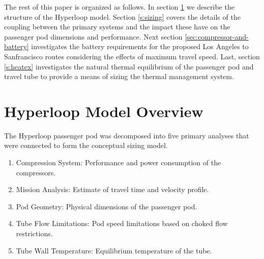 \documentclass[heading.tex]{subfiles}
\begin{document}
The rest of this paper is organized as follows. In section \ref{s:struct} we describe the structure of the Hyperloop 
model. Section \ref{s:sizing} covers the details of the coupling between the primary systems and the impact these have 
on the passenger pod dimensions and performance. Next section \ref{sec:compressor-and-battery}
investigates the battery requirements for the proposed Los Angeles to Sanfrancisco routes considering the effects 
of maximum travel speed. Last, section \ref{s:heatex} investigates the natural thermal equilibrium of the passenger pod and
travel tube to provide a means of sizing the thermal management system. 



\section{Hyperloop Model Overview}
\label{s:struct}

The Hyperloop passenger pod was decomposed into five primary analyses that were connected to 
form the conceptual sizing model. 

\begin{enumerate}
  \item Compression System: Performance and power consumption of the compressors.
  \item Mission Analysis: Estimate of travel time and velocity profile.
  \item Pod Geometry: Physical dimensions of the passenger pod.
  \item Tube Flow Limitations: Pod speed limitations based on choked flow restrictions.
  \item Tube Wall Temperature: Equilibrium temperature of the tube.
\end{enumerate}
\end{document}
